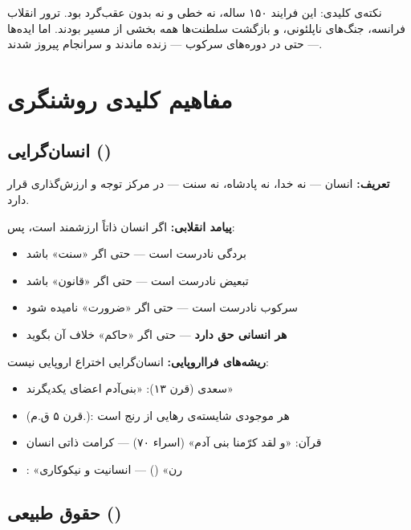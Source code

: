نکته‌ی کلیدی: این فرایند ۱۵۰ ساله، نه خطی و نه بدون عقب‌گرد بود.
ترور انقلاب فرانسه، جنگ‌های ناپلئونی، و بازگشت سلطنت‌ها همه بخشی از
مسیر بودند. اما ایده‌ها — حتی در دوره‌های سرکوب — زنده ماندند و سرانجام
پیروز شدند.


\section{مفاهیم کلیدی روشنگری}
\label{sec:ch16-key-concepts}

\subsection{انسان‌گرایی (\texorpdfstring{}{Humanism})}

\begin{tcolorbox}[successbox, title={تعریف و پیامدها}]
\textbf{تعریف:} انسان — نه خدا، نه پادشاه، نه سنت — در مرکز توجه و
ارزش‌گذاری قرار دارد.

\textbf{پیامد انقلابی:} اگر انسان ذاتاً ارزشمند است، پس:
\begin{itemize}
\item بردگی نادرست است — حتی اگر «سنت» باشد
\item تبعیض نادرست است — حتی اگر «قانون» باشد
\item سرکوب نادرست است — حتی اگر «ضرورت» نامیده شود
\item \textbf{هر انسانی حق دارد} — حتی اگر «حاکم» خلاف آن بگوید
\end{itemize}

\textbf{ریشه‌های فرااروپایی:} انسان‌گرایی اختراع اروپایی نیست:
\begin{itemize}
\item سعدی (قرن ۱۳): «بنی‌آدم اعضای یکدیگرند»
\item {} (قرن ۵ ق.م.): هر موجودی شایسته‌ی رهایی از رنج است
\item قرآن: «و لقد کرّمنا بنی آدم» (اسراء ۷۰) — کرامت ذاتی انسان
\item {}: «رن» () — انسانیت و نیکوکاری
\end{itemize}
\end{tcolorbox}


\subsection{حقوق طبیعی (\texorpdfstring{}{Natural Rights})}


